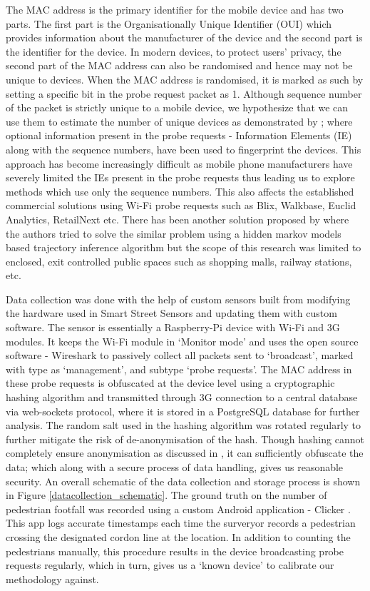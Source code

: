 The MAC address is the primary identifier for the mobile device and has two
parts. The first part is the Organisationally Unique Identifier (OUI) which
provides information about the manufacturer of the device and the second part is
the identifier for the device. In modern devices, to protect users' privacy, the
second part of the MAC address can also be randomised and hence may not be
unique to devices. When the MAC address is randomised, it is marked as such by
setting a specific bit in the probe request packet as 1. Although sequence
number of the packet is strictly unique to a mobile device, we hypothesize that
we can use them to estimate the number of unique devices as demonstrated by
\citep{vanhoef2016}; where optional information present in the probe requests -
Information Elements (IE) along with the sequence numbers, have been used to
fingerprint the devices. This approach has become increasingly difficult as
mobile phone manufacturers have severely limited the IEs present in the probe
requests thus leading us to explore methods which use only the sequence numbers.
This also affects the established commercial solutions using Wi-Fi probe
requests such as Blix, Walkbase, Euclid Analytics, RetailNext etc.  There has
been another solution proposed by \citep{hong2018crowdprobe} where the authors
tried to solve the similar problem using a hidden markov models based trajectory
inference algorithm but the scope of this research was limited to enclosed,
exit controlled public spaces such as shopping malls, railway stations, etc.

Data collection was done with the help of custom sensors built from modifying
the hardware used in Smart Street Sensors \citep{sss2016} and updating them with
custom software. The sensor is essentially a Raspberry-Pi device with Wi-Fi and
3G modules. It keeps the Wi-Fi module in `Monitor mode' and uses the open source
software - Wireshark \citep{wireshark2} to passively collect all packets sent to
`broadcast', marked with type as `management', and subtype `probe requests'.
The MAC address in these probe requests is obfuscated at the device level using
a cryptographic hashing algorithm and transmitted through 3G connection to a
central database via web-sockets protocol, where it is stored in a PostgreSQL
database for further analysis. The random salt used in the hashing algorithm was
rotated regularly to further mitigate the risk of de-anonymisation of the hash.
Though hashing cannot completely ensure anonymisation as discussed in
\citep{demir2014analysing}, it can sufficiently obfuscate the data; which along
with a secure process of data handling, gives us reasonable security. An overall
schematic of the data collection and storage process is shown in Figure
\ref{datacollection_schematic}. The ground truth on the number of pedestrian
footfall was recorded using a custom Android application - Clicker
\citep{bala2018clicker}. This app logs accurate timestamps each time the
surveryor records a pedestrian crossing the designated cordon line at the
location. In addition to counting the pedestrians manually, this procedure
results in the device broadcasting probe requests regularly, which in turn,
gives us a `known device' to calibrate our methodology against.

